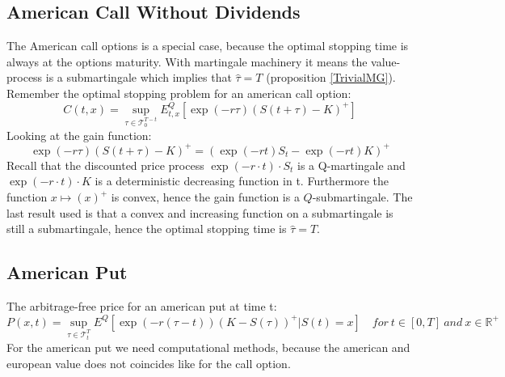 \subsection{American Call Without Dividends}
The American call options is a special case, because the optimal stopping time is always at the options maturity. With martingale machinery it means the value-process is a submartingale which implies that $\hat{\tau}=T$ (proposition \ref{TrivialMG}). Remember the optimal stopping problem for an american call option:
$$C(t,x)=\sup_{\tau \in \mathcal{T}_0^{T-t}} E_{t,x}^Q[\exp(-r\tau) (S(t+\tau)-K)^+]$$
Looking at the gain function:
\begin{equation*}
\exp(-r\tau) (S(t+\tau)-K)^+ = (\exp(-r t) S_{t} - \exp(-r t) K)^+
\end{equation*}
Recall that the discounted price process $\exp(-r\cdot t) \cdot S_t$ is a Q-martingale and $\exp(-r\cdot t) \cdot K$ is a deterministic decreasing function in t. Furthermore the function $x \mapsto (x)^+$ is convex, hence the gain function is a $Q$-submartingale. The last result used is that a convex and increasing function on a submartingale is still a submartingale, hence the optimal stopping time is $\hat{\tau}=T$.

\subsection{American Put}\label{americanPut}
The arbitrage-free price for an american put at time t:
\begin{equation}\label{AmericanPutPrice}
P(x,t)=\sup_{\tau \in \mathcal{T}_t^T} E^Q[\exp(-r(\tau-t)) (K-S(\tau))^+|S(t)=x] \quad for \ t\in [0,T] \ and \ x\in\mathbb{R}^+
\end{equation}
For the american put we need computational methods, because the american and european value does not coincides like for the call option.

